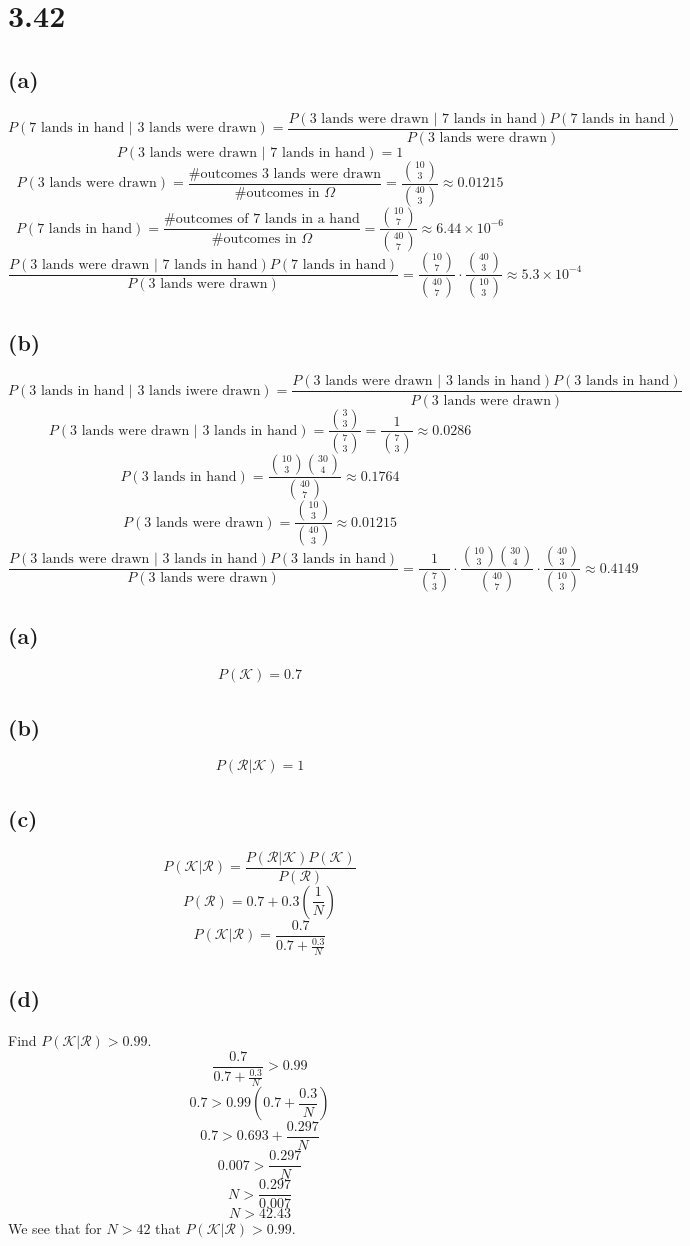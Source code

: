 \documentclass[11pt]{article}
\begin{document}
\section*{3.42}
\subsection*{(a)}
\[P(\text{7 lands in hand }|\text{ 3 lands were drawn})=\frac{P(\text{3 lands were drawn }|\text{ 7 lands in hand})P(\text{7 lands in hand})}{P(\text{3 lands were drawn})}\]
\[P(\text{3 lands were drawn }|\text{ 7 lands in hand})=1\]
\[P(\text{3 lands were drawn})=\frac{\text{\# outcomes 3 lands were drawn}}{\text{\# outcomes in }\Omega}=\frac{\binom{10}{3}}{\binom{40}{3}}\approx 0.01215\]
\[P(\text{7 lands in hand})=\frac{\text{\# outcomes of 7 lands in a hand}}{\text{\# outcomes in }\Omega}=\frac{\binom{10}{7}}{\binom{40}{7}}\approx6.44\times10^{-6}\]
\[\frac{P(\text{3 lands were drawn }|\text{ 7 lands in hand})P(\text{7 lands in hand})}{P(\text{3 lands were drawn})}=\frac{\binom{10}{7}}{\binom{40}{7}}\cdot\frac{\binom{40}{3}}{\binom{10}{3}}\approx5.3\times10^{-4}\]
\subsection*{(b)}
\[P(\text{3 lands in hand }|\text{ 3 lands iwere drawn})=\frac{P(\text{3 lands were drawn }|\text{ 3 lands in hand})P(\text{3 lands in hand})}{P(\text{3 lands were drawn})}\]
\[P(\text{3 lands were drawn }|\text{ 3 lands in hand})=\frac{\binom{3}{3}}{\binom{7}{3}}=\frac{1}{\binom{7}{3}}\approx0.0286\]
\[P(\text{3 lands in hand})=\frac{\binom{10}{3}\binom{30}{4}}{\binom{40}{7}}\approx0.1764\]
\[P(\text{3 lands were drawn})=\frac{\binom{10}{3}}{\binom{40}{3}}\approx0.01215\]
\[\frac{P(\text{3 lands were drawn }|\text{ 3 lands in hand})P(\text{3 lands in hand})}{P(\text{3 lands were drawn})}=\frac{1}{\binom{7}{3}}\cdot\frac{\binom{10}{3}\binom{30}{4}}{\binom{40}{7}}\cdot\frac{\binom{40}{3}}{\binom{10}{3}}\approx0.4149\]
\clearpage
\subsection*{(a)}
\[P(\mathcal{K})=0.7\]
\subsection*{(b)}
\[P(\mathcal{R}|\mathcal{K})=1\]
\subsection*{(c)}
\[P(\mathcal{K}|\mathcal{R})=\frac{P(\mathcal{R}|\mathcal{K})P(\mathcal{K})}{P(\mathcal{R})}\]
\[P(\mathcal{R})=0.7+0.3\left(\frac{1}{N}\right)\]
\[P(\mathcal{K}|\mathcal{R})=\frac{0.7}{0.7+\frac{0.3}{N}}\]
\subsection*{(d)}
Find $P(\mathcal{K}|\mathcal{R})>0.99$.
\[\frac{0.7}{0.7+\frac{0.3}{N}}>0.99\]
\[0.7>0.99\left(0.7+\frac{0.3}{N}\right)\]
\[0.7>0.693+\frac{0.297}{N}\]
\[0.007>\frac{0.297}{N}\]
\[N>\frac{0.297}{0.007}\]
\[N>42.43\]
We see that for $N>42$ that $P(\mathcal{K}|\mathcal{R})>0.99$.
\end{document}
